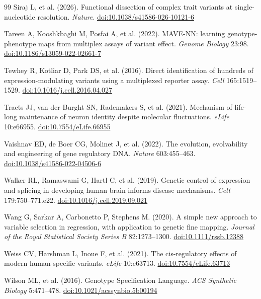\begin{thebibliography}{99}
 Siraj L, et al. (2026). Functional dissection of complex trait variants at single-nucleotide resolution. \textit{Nature}. \href{https://doi.org/10.1038/s41586-026-10121-6}{doi:10.1038/s41586-026-10121-6}

 Tareen A, Kooshkbaghi M, Posfai A, et al. (2022). MAVE-NN: learning genotype-phenotype maps from multiplex assays of variant effect. \textit{Genome Biology} 23:98. \href{https://doi.org/10.1186/s13059-022-02661-7}{doi:10.1186/s13059-022-02661-7}

 Tewhey R, Kotliar D, Park DS, et al. (2016). Direct identification of hundreds of expression-modulating variants using a multiplexed reporter assay. \textit{Cell} 165:1519–1529. \href{https://doi.org/10.1016/j.cell.2016.04.027}{doi:10.1016/j.cell.2016.04.027}

 Traets JJ, van der Burght SN, Rademakers S, et al. (2021). Mechanism of life-long maintenance of neuron identity despite molecular fluctuations. \textit{eLife} 10:e66955. \href{https://doi.org/10.7554/eLife.66955}{doi:10.7554/eLife.66955}

 Vaishnav ED, de Boer CG, Molinet J, et al. (2022). The evolution, evolvability and engineering of gene regulatory DNA. \textit{Nature} 603:455–463. \href{https://doi.org/10.1038/s41586-022-04506-6}{doi:10.1038/s41586-022-04506-6}

 Walker RL, Ramaswami G, Hartl C, et al. (2019). Genetic control of expression and splicing in developing human brain informs disease mechanisms. \textit{Cell} 179:750–771.e22. \href{https://doi.org/10.1016/j.cell.2019.09.021}{doi:10.1016/j.cell.2019.09.021}

 Wang G, Sarkar A, Carbonetto P, Stephens M. (2020). A simple new approach to variable selection in regression, with application to genetic fine mapping. \textit{Journal of the Royal Statistical Society Series B} 82:1273–1300. \href{https://doi.org/10.1111/rssb.12388}{doi:10.1111/rssb.12388}

 Weiss CV, Harshman L, Inoue F, et al. (2021). The cis-regulatory effects of modern human-specific variants. \textit{eLife} 10:e63713. \href{https://doi.org/10.7554/eLife.63713}{doi:10.7554/eLife.63713}

 Wilson ML, et al. (2016). Genotype Specification Language. \textit{ACS Synthetic Biology} 5:471–478. \href{https://doi.org/10.1021/acssynbio.5b00194}{doi:10.1021/acssynbio.5b00194}


\end{thebibliography}

